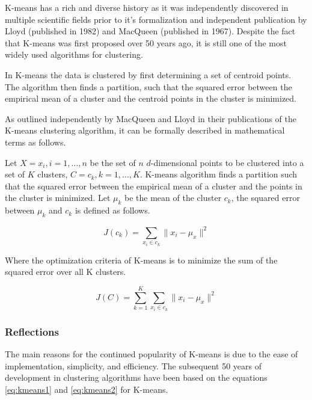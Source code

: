 \documentclass{article}
\begin{document}
K-means has a rich and diverse history as it was independently discovered in multiple scientific fields prior to it's formalization and independent publication by Lloyd (published in 1982)\cite{lloyd1982least} and MacQueen (published in 1967)\cite{macqueen1967some}. Despite the fact that K-means was first proposed over 50 years ago, it is still one of the most widely used algorithms for clustering\cite{jain2010}.

In K-means the data is clustered by first determining a set of centroid points. The algorithm then finds a partition, such that the squared error between the empirical mean of a cluster and the centroid points in the cluster is minimized\cite{macqueen1967some, lloyd1982least}.

As outlined independently by MacQueen and Lloyd in their publications of the K-means clustering algorithm, it can be formally described in mathematical terms as follows.

Let $X = {x_i}, i = 1, \ldots, n$ be the set of $n$ $d$-dimensional points to be clustered into a set of $K$ clusters, $C = {c_k, k = 1, \ldots, K}$. K-means algorithm finds a partition such that the squared error between the empirical mean of a cluster and the points in the cluster is minimized. Let $\mu_k$ be the mean of the cluster $c_k$, the squared error between $\mu_k$ and $c_k$ is defined as follows.

\begin{equation}
J(c_k) = \sum_{x_i \in c_k}^{} \|x_i - \mu_x\|^{2}
\label{eq:kmeans1}
\end{equation}

Where the optimization criteria of K-means is to minimize the sum of the squared error over all K clusters.

\begin{equation}
J(C) = \sum_{k = 1}^{K} \sum_{x_i \in c_k}^{} \|x_i - \mu_x\|^{2}
\label{eq:kmeans2}
\end{equation}

\subsubsection{Reflections}

The main reasons for the continued popularity of K-means is due to the ease of implementation, simplicity, and efficiency\cite{jain2010}. The subsequent 50 years of development in clustering algorithms have been based on the equations \ref{eq:kmeans1} and \ref{eq:kmeans2} for K-means. 
\end{document}
